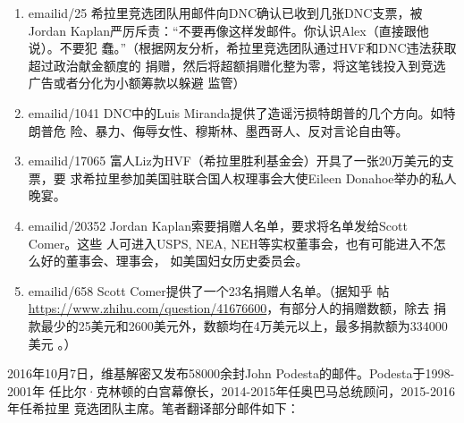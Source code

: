 \begin{enumerate}
\item emailid/25 希拉里竞选团队用邮件向DNC确认已收到几张DNC支票，被Jordan
  Kaplan严厉斥责：“不要再像这样发邮件。你认识Alex（直接跟他说）。不要犯
  蠢。”（根据网友分析，希拉里竞选团队通过HVF和DNC违法获取超过政治献金额度的
  捐赠，然后将超额捐赠化整为零，将这笔钱投入到竞选广告或者分化为小额筹款以躲避
  监管）

\item emailid/1041 DNC中的Luis Miranda提供了造谣污损特朗普的几个方向。如特朗普危
  险、暴力、侮辱女性、穆斯林、墨西哥人、反对言论自由等。

\item emailid/17065 富人Liz为HVF（希拉里胜利基金会）开具了一张20万美元的支票，要
  求希拉里参加美国驻联合国人权理事会大使Eileen Donahoe举办的私人晚宴。

\item emailid/20352 Jordan Kaplan索要捐赠人名单，要求将名单发给Scott Comer。这些
  人可进入USPS, NEA, NEH等实权董事会，也有可能进入不怎么好的董事会、理事会，
  如美国妇女历史委员会。

\item emailid/658 Scott Comer提供了一个23名捐赠人名单。（据知乎
  帖 \url{https://www.zhihu.com/question/41676600}，有部分人的捐赠数额，除去
  捐款最少的25美元和2600美元外，数额均在4万美元以上，最多捐款额为334000美元
  。）
\end{enumerate}

2016年10月7日，维基解密又发布58000余封John Podesta的邮件。Podesta于1998-2001年
任比尔·克林顿的白宫幕僚长，2014-2015年任奥巴马总统顾问，2015-2016年任希拉里
竞选团队主席。笔者翻译部分邮件如下：

